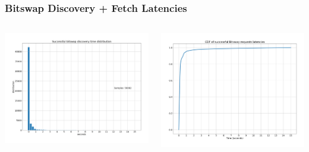 \documentclass{../pl-slide}
\begin{document}
\begin{frame}
\frametitle{Bitswap Discovery + Fetch Latencies}
\begin{columns}[onlytextwidth]
\begin{column}{0.49\textwidth}
    \begin{center}
                \includegraphics[width=\textwidth]{plots/pdf15.png}
    \end{center}
\end{column}
\begin{column}{0.49\textwidth}
    \begin{center}
                \includegraphics[width=\textwidth]{plots/cdf15.png}
    \end{center}
\end{column}
\end{columns}

\end{frame}
\end{document}
